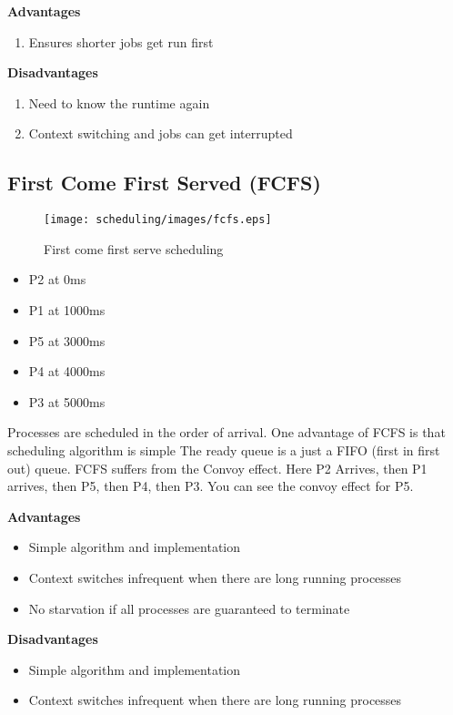 \textbf{Advantages}

\begin{enumerate}
  \item Ensures shorter jobs get run first
\end{enumerate}

\textbf{Disadvantages}

\begin{enumerate}
  \item Need to know the runtime again
  \item Context switching and jobs can get interrupted
\end{enumerate}

\subsection{First Come First Served (FCFS)}

\begin{figure}[htbp]
\centering
\texttt{[image: scheduling/images/fcfs.eps]}
\caption{First come first serve scheduling}
\end{figure}

\begin{itemize}
\tightlist
\item
  P2 at 0ms
\item
  P1 at 1000ms
\item
  P5 at 3000ms
\item
  P4 at 4000ms
\item
  P3 at 5000ms
\end{itemize}

Processes are scheduled in the order of arrival.
One advantage of FCFS is that scheduling algorithm is simple
The ready queue is a just a FIFO (first in first out) queue.
FCFS suffers from the Convoy effect.
Here P2 Arrives, then P1 arrives, then P5, then P4, then P3. You can see the convoy effect for P5.

\textbf{Advantages}

\begin{itemize}
\item Simple algorithm and implementation
\item Context switches infrequent when there are long running processes
\item No starvation if all processes are guaranteed to terminate
\end{itemize}

\textbf{Disadvantages}
\begin{itemize}
\item Simple algorithm and implementation
\item Context switches infrequent when there are long running processes

\end{itemize}

